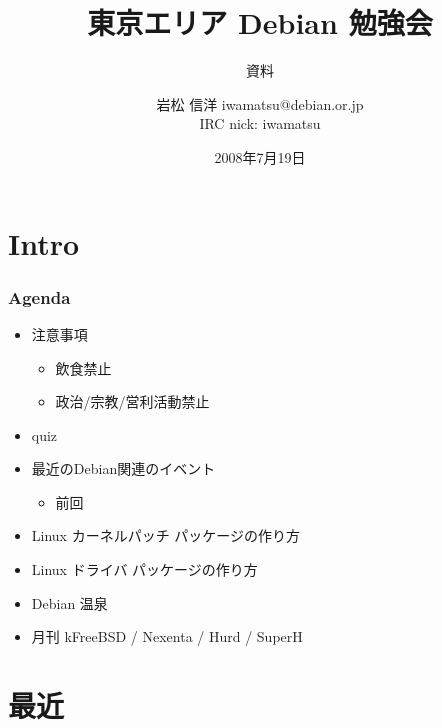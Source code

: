 \documentclass[cjk,dvipdfmx,12pt]{beamer}
\title{東京エリア Debian 勉強会}
\subtitle{資料}
\author{岩松 信洋 iwamatsu@debian.or.jp\\IRC nick: iwamatsu}
\date{2008年7月19日}
\begin{document}
\frame{\titlepage{}}


\section{Intro}


\begin{frame}
 \frametitle{Agenda}
\begin{minipage}[t]{0.45\hsize}
  \begin{itemize}
  \item 注意事項
	\begin{itemize}
	 \item 飲食禁止
	 \item 政治/宗教/営利活動禁止
	\end{itemize}
  \item quiz
  \item 最近のDebian関連のイベント
	\begin{itemize}
	 \item 前回 
	\end{itemize}
 \end{itemize}
\end{minipage} 
\begin{minipage}[t]{0.45\hsize}
 \begin{itemize}
  \item Linux カーネルパッチ パッケージの作り方
  \item Linux ドライバ パッケージの作り方
  \item Debian 温泉
  \item 月刊 kFreeBSD / Nexenta / Hurd / SuperH
 \end{itemize}
\end{minipage}
\end{frame}

\section{最近}
\end{document}
